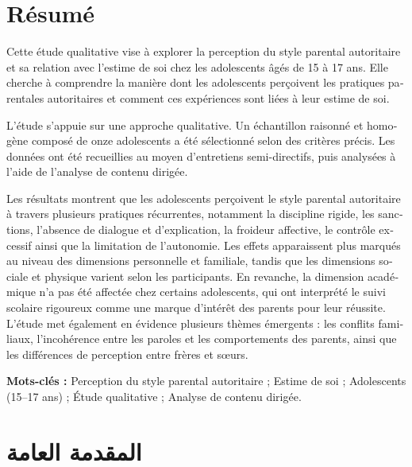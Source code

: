 \documentclass[12pt,oneside]{report}
\begin{document}
\chapter*{Résumé}
\begin{french}
Cette étude qualitative vise à explorer la perception du style parental autoritaire et sa
relation avec l'estime de soi chez les adolescents âgés de 15 à 17 ans. Elle cherche à
comprendre la manière dont les adolescents perçoivent les pratiques parentales autoritaires
et comment ces expériences sont liées à leur estime de soi.\par
L'étude s'appuie sur une approche qualitative. Un échantillon raisonné et homogène composé de
onze adolescents a été sélectionné selon des critères précis. Les données ont été recueillies
au moyen d'entretiens semi-directifs, puis analysées à l'aide de l'analyse de contenu dirigée.\par
Les résultats montrent que les adolescents perçoivent le style parental autoritaire à travers
plusieurs pratiques récurrentes, notamment la discipline rigide, les sanctions, l'absence de
dialogue et d'explication, la froideur affective, le contrôle excessif ainsi que la limitation
de l'autonomie. Les effets apparaissent plus marqués au niveau des dimensions personnelle et
familiale, tandis que les dimensions sociale et physique varient selon les participants. En
revanche, la dimension académique n'a pas été affectée chez certains adolescents, qui ont
interprété le suivi scolaire rigoureux comme une marque d'intérêt des parents pour leur
réussite. L'étude met également en évidence plusieurs thèmes émergents : les conflits
familiaux, l'incohérence entre les paroles et les comportements des parents, ainsi que les
différences de perception entre frères et sœurs.\par
\noindent\textbf{Mots-clés :} Perception du style parental autoritaire ; Estime de soi ;
Adolescents (15--17 ans) ; Étude qualitative ; Analyse de contenu dirigée.
\end{french}

\cleardoublepage
\tableofcontents
\listoftables
\cleardoublepage
{}

\chapter*{المقدمة العامة}
\end{document}
